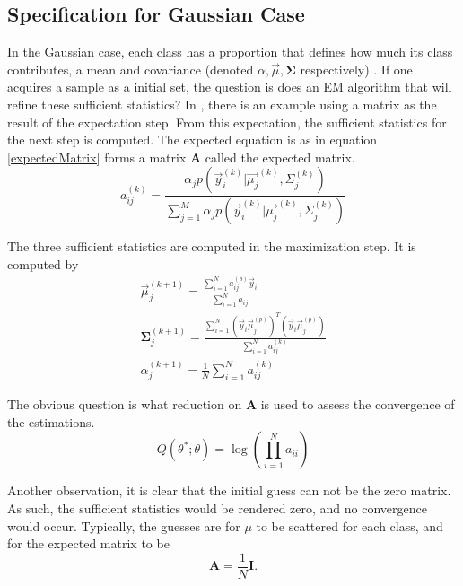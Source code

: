 \documentclass[11pt]{article}
\begin{document}
\subsection{Specification for Gaussian Case}
In the Gaussian case, each class has a proportion that defines how much its class contributes, a mean and covariance (denoted $\alpha, \vec{\mu}, \mathbf{\Sigma}$ respectively) .   If one acquires a sample as a initial set, the question is does an EM algorithm that will refine these sufficient statistics?   %
In \cite{yamazaki98introduction}, there is an example using a matrix as the result of the expectation step.  From this expectation, the sufficient statistics for the next step is computed.   The expected equation is as in equation \ref{expectedMatrix} forms a matrix $\mathbf{A}$ called the expected matrix.
\begin{equation}
a_{ij}^{(k)}     = \frac {\alpha_j p(\vec{y}_i  ^{(k)}  | \vec{\mu_j} ^{(k)} , \Sigma_j ^{(k)}  )}{\sum_{j=1}^M \alpha_j p(\vec{y}_i  ^{(k)}  | \vec{\mu_j} ^{(k)} , \Sigma_j ^{(k)}  )} \label{expectedMatrix}
\end{equation}


The three sufficient statistics are computed in the maximization step.   It is computed by
\begin{eqnarray}
\vec{\mu} _j ^{(k+1)} = \frac{\sum_{i=1} ^N a_{ij}^{(p)} \vec{y}_i} {\sum_{i=1}^N a_{ij} } \\
\mathbf{\Sigma} _j ^{(k+1)} = \frac {\sum_{i=1}^N (\vec{y}_i \vec{\mu}_j ^{(p)} )^T(\vec{y}_i \vec{\mu}_j ^{(p)} ) } {\sum_{i=1}^N a^{(k)}_{ij}}  \\
\alpha _j ^ {(k+1)} = \frac{1}{N} \sum_{i=1}^N a^{(k)}_{ij}
\end{eqnarray}



The obvious question is what reduction on $\mathbf{A}$ is used to assess the convergence of the estimations.  %
\begin{equation}
Q ( \theta ^* ; \theta ) =\log (\prod_{i=1} ^N  a_{ii} )
\end{equation}


Another observation, it is clear that the initial guess can not be the zero matrix.  As such, the sufficient statistics would be rendered zero, and no convergence would occur.   Typically, the guesses are for $\mu$ to be scattered for each class, and for the expected matrix to be 
\[ 
\mathbf{A} = \frac{1}{N} \mathbf{I}.
\]
\end{document}
